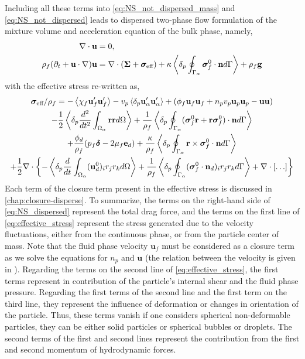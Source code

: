 Including all these terms into \ref{eq:NS_not_dispersed_mass} and \ref{eq:NS_not_dispersed} leads to dispersed two-phase flow formulation of the mixture volume and acceleration equation of the bulk phase, namely, 
\begin{align}
    \div\textbf{u}&=0, \\
    \rho_f (\pddt 
    + \textbf{u}\cdot \grad)
    \textbf{u}
    &= 
    \div (\bm\Sigma +  \bm{\sigma}_\text{eff} )
    + \kappa \pSavg{ \bm{\sigma}_f^0 \cdot \textbf{n}} 
    + \rho_f\textbf{g} 
    \label{eq:NS_dispersed}
\end{align}
with the effective stress re-written as, 
\begin{multline}
    \bm\sigma_\text{eff}/\rho_f = 
    - \avg{ \chi_f \textbf{u}_f'\textbf{u}_f'}
    - v_p \pavg{ \textbf{u}_\alpha'\textbf{u}_\alpha'}
    + (\phi_f \textbf{u}_f \textbf{u}_f
        +n_pv_p\textbf{u}_p \textbf{u}_p
        - \textbf{uu} 
    )\\
    -\frac{1}{2}\pavg{\frac{d^2 }{dt^2}\intO{\textbf{rr}}}
    +\frac{1}{\rho_f}\pSavg{ 
        (\bm{\sigma}_f^0 \textbf{r}
        + \textbf{r}\bm{\sigma}_f^0 )
        \cdot \textbf{n}
    }\\
    + \frac{\phi_d}{\rho_f} (p_f\bm\delta -2\mu_f \textbf{e}_d)
    + \frac{\kappa}{\rho_f}\pSavg{ \textbf{r} \times \bm{\sigma}_f^0  \cdot \textbf{n}}
    \\
    +\frac{1}{2}\div\left\{
    - \pavg{\ddt\intO{  (\textbf{u}_d^0)_i r_j r_k }}
    +\frac{1}{\rho_f}\pSavg{  (\bm{\sigma}_f^0 \cdot \textbf{n}_d)_i r_{j}  r_{k}  } 
    + \div[\ldots]
    \right\}
    \label{eq:effective_stress}
\end{multline}
Each term of the closure term present in the effective stress is discussed in \ref{chap:closure-disperse}.
To summarize, the terms on the right-hand side of \ref{eq:NS_dispersed} represent the total drag force, and the terms on the first line of \ref{eq:effective_stress} represent the stress generated due to the velocity fluctuations, either from the continuous phase, or from the particle center of mass. 
Note that the fluid phase velocity $\textbf{u}_f$ must be considered as a closure term as we solve the equations for $n_p$ and  $\textbf{u}$ (the relation between the velocity is given in \citet{zaepffel2012multisize}).
Regarding the terms on the second line of \ref{eq:effective_stress}, the first terms represent in contribution of the particle's internal shear and the fluid phase pressure.
Regarding the first terms of the second line and the first term on the third line, they represent the influence of deformation or changes in orientation of the particle. 
Thus, these terms vanish if one considers spherical non-deformable particles, they can be either solid particles or spherical bubbles or droplets. 
The second terms of the first and second lines represent the contribution from the first and second momentum of hydrodynamic forces. 


